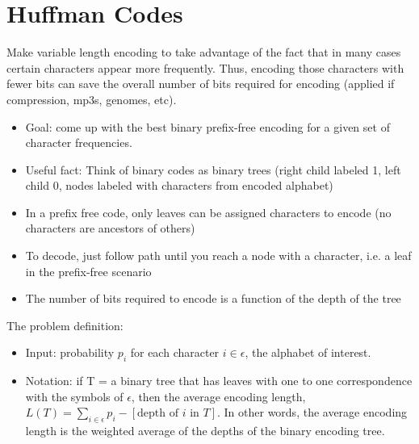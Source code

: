\documentclass{article}
\begin{document}
\section{Huffman Codes}
Make variable length encoding to take advantage of the fact that in many cases certain characters appear more frequently.
Thus, encoding those characters with fewer bits can save the overall number of bits required for encoding (applied if compression, 
mp3s, genomes, etc).
\begin{itemize}
\item Goal: come up with the best binary prefix-free encoding for a given set of character frequencies.
\item Useful fact: Think of binary codes as binary trees (right child labeled 1, left child 0, nodes labeled with characters from
encoded alphabet)
\item In a prefix free code, only leaves can be assigned characters to encode (no characters are ancestors of others)
\item To decode, just follow path until you reach a node with a character, i.e. a leaf in the prefix-free scenario
\item The number of bits required to encode is a function of the depth of the tree
\end{itemize}
The problem definition:
\
\begin{itemize}
\item Input: probability $p_i$ for each character $i \in \epsilon$, the alphabet of interest.
\item Notation: if T = a binary tree that has leaves with one to one correspondence with the symbols of $\epsilon$,
then the average encoding length, $L(T) = \sum_{i\in\epsilon}p_i - [\text{depth of }i \text{ in } T]$.  In other words, 
the average encoding length is the weighted average of the depths of the binary encoding tree.
\end{itemize}
\end{document}
